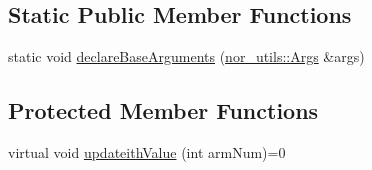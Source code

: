 \subsection*{Static Public Member Functions}
\begin{DoxyCompactItemize}
\item 
static void \hyperlink{classMultiBoost_1_1GenericBanditAlgorithm_a682dbb2ced08650e04a8da69a6a1c517}{declare\-Base\-Arguments} (\hyperlink{classnor__utils_1_1Args}{nor\-\_\-utils\-::\-Args} \&args)
\end{DoxyCompactItemize}
\subsection*{Protected Member Functions}
\begin{DoxyCompactItemize}
\item 
virtual void \hyperlink{classMultiBoost_1_1GenericBanditAlgorithm_a46066e41b12d20f0b962d3f46d9b0d22}{updateith\-Value} (int arm\-Num)=0
\end{DoxyCompactItemize}
